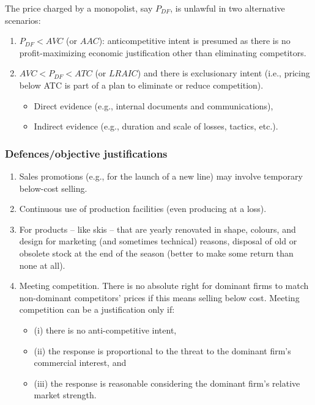         The price charged by a monopolist, say \( P_{DF} \), is unlawful in two alternative scenarios:
        
        \begin{enumerate}
            \item \( P_{DF} < AVC \) (or \( AAC \)): anticompetitive intent is presumed as there is no profit-maximizing economic justification other than eliminating competitors.
            \item \( AVC < P_{DF} < ATC \) (or \( LRAIC \)) and there is exclusionary intent (i.e., pricing below ATC is part of a plan to eliminate or reduce competition).
            \begin{itemize}
                \item Direct evidence (e.g., internal documents and communications),
                \item Indirect evidence (e.g., duration and scale of losses, tactics, etc.).
            \end{itemize}
        \end{enumerate}

        \subsubsection{Defences/objective justifications}

            \begin{enumerate}
                \item Sales promotions (e.g., for the launch of a new line) may involve temporary below-cost selling.
                \item Continuous use of production facilities (even producing at a loss).
                \item For products – like skis – that are yearly renovated in shape, colours, and design for marketing (and sometimes technical) reasons, disposal of old or obsolete stock at the end of the season (better to make some return than none at all).
                \item Meeting competition. There is no absolute right for dominant firms to match non-dominant competitors’ prices if this means selling below cost. Meeting competition can be a justification only if:
                \begin{itemize}
                    \item (i) there is no anti-competitive intent,
                    \item (ii) the response is proportional to the threat to the dominant firm’s commercial interest, and
                    \item (iii) the response is reasonable considering the dominant firm’s relative market strength.
                \end{itemize}
            \end{enumerate}

